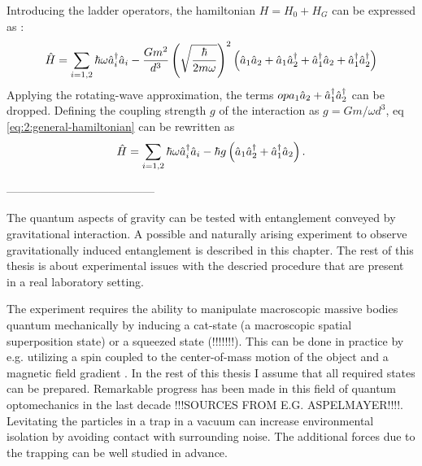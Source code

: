 Introducing the ladder operators, the hamiltonian $H=H_0 + H_G$ can be expressed as \cite{Carney_2018}:
\begin{equation}\label{eq:2:general-hamiltonian}
  \hat{H} = \sum_{i=1,2} \hbar \omega \hat{a}_i^\dagger \hat{a}_i - \frac{Gm^2}{d^3} \left(\sqrt{\frac{\hbar}{2m\omega}}\right)^2 \left( \hat{a}_1\hat{a}_2 + \hat{a}_1\hat{a}^\dagger_2 + \hat{a}^\dagger_1\hat{a}_2 + \hat{a}^\dagger_1\hat{a}^\dagger_2 \right)
\end{equation}
Applying the rotating-wave approximation, the terms $op{a}_1\hat{a}_2 + \hat{a}^\dagger_1\hat{a}^\dagger_2$ can be dropped. Defining the coupling strength $g$ of the interaction as $g = Gm/\omega d^3$, eq \eqref{eq:2:general-hamiltonian} can be rewritten as
\begin{equation}
  \hat{H} = \sum_{i=1,2} \hbar \omega \hat{a}_i^\dagger \hat{a}_i - \hbar g \left( \hat{a}_1\hat{a}^\dagger_2 + \hat{a}^\dagger_1\hat{a}_2 \right) .
\end{equation}




---------------------------------------




The quantum aspects of gravity can be tested with entanglement conveyed by gravitational interaction. A possible and naturally arising experiment to observe gravitationally induced entanglement is described in this chapter.
The rest of this thesis is about experimental issues with the descried procedure that are present in a real laboratory setting.

The experiment requires the ability to manipulate macroscopic massive bodies quantum mechanically by inducing a cat-state (a macroscopic spatial superposition state) or a squeezed state (!!!!!!!). 
This can be done in practice by e.g. utilizing a spin coupled to the center-of-mass motion of the object and a magnetic field gradient \cite{Bose_2017}. In the rest of this thesis I assume that all required states can be prepared.
Remarkable progress has been made in this field of quantum optomechanics in the last decade !!!SOURCES FROM E.G. ASPELMAYER!!!!.
Levitating the particles in a trap in a vacuum can increase environmental isolation by avoiding contact with surrounding noise. The additional forces due to the trapping can be well studied in advance.

